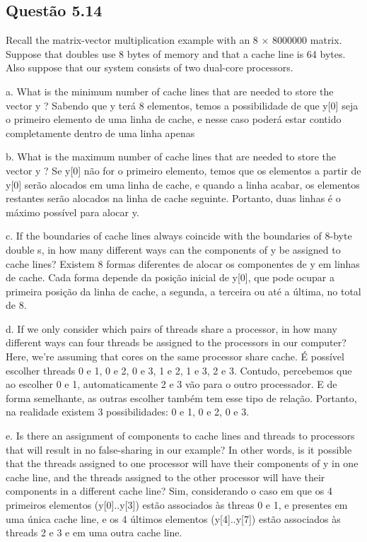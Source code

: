 
\subsection{Questão 5.14}

Recall the matrix-vector multiplication example with an 8 $\times$ 8000000 matrix. Suppose that doubles use 8 bytes of memory and that a cache line is 64 bytes. Also suppose that our system consists of two dual-core processors.

a. What is the minimum number of cache lines that are needed to store the vector y ?
Sabendo que y terá 8 elementos, temos a possibilidade de que y[0] seja o primeiro elemento de uma linha de cache, e nesse caso poderá estar contido completamente dentro de uma linha apenas

b. What is the maximum number of cache lines that are needed to store the vector y ? Se y[0] não for o primeiro elemento, temos que os elementos a partir de y[0] serão alocados em uma linha de cache, e quando a linha acabar, os elementos restantes serão alocados na linha de cache seguinte. Portanto, duas linhas é o máximo possível para alocar y.

c. If the boundaries of cache lines always coincide with the boundaries of 8-byte double s, in how many different ways can the components of y be assigned to cache lines?
Existem 8 formas diferentes de alocar os componentes de y em linhas de cache. Cada forma depende da posição inicial de y[0], que pode ocupar a primeira posição da linha de cache, a segunda, a terceira ou até a última, no total de 8.

d. If we only consider which pairs of threads share a processor, in how many different ways can four threads be assigned to the processors in our computer? Here, we’re assuming that cores on the same processor share cache.
É possível escolher threads 0 e 1, 0 e 2, 0 e 3, 1 e 2, 1 e 3, 2 e 3. Contudo, percebemos que ao escolher 0 e 1, automaticamente 2 e 3 vão para o outro processador. E de forma semelhante, as outras escolher também tem esse tipo de relação. Portanto, na realidade existem 3 possibilidades: 0 e 1, 0 e 2, 0 e 3.

e. Is there an assignment of components to cache lines and threads to processors that will result in no false-sharing in our example? In other words, is it possible that the threads assigned to one processor will have their components of y in one cache line, and the threads assigned to the other processor
will have their components in a different cache line?
Sim, considerando o caso em que os 4 primeiros elementos (y[0]..y[3]) estão associados às threas 0 e 1, e presentes em uma única cache line, e os 4 últimos elementos (y[4]..y[7]) estão associados às threads 2 e 3 e em uma outra cache line.

